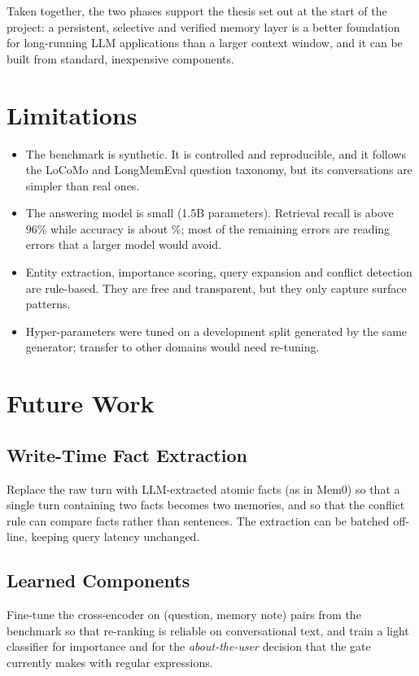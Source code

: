 Taken together, the two phases support the thesis set out at the start of the project: a persistent,
selective and verified memory layer is a better foundation for long-running LLM applications than a larger
context window, and it can be built from standard, inexpensive components.

\section{Limitations}
\begin{itemize}[nosep]
  \item The benchmark is synthetic. It is controlled and reproducible, and it follows the LoCoMo and
        LongMemEval question taxonomy, but its conversations are simpler than real ones.
  \item The answering model is small (1.5B parameters). Retrieval recall is above 96\% while accuracy is
        about \accMem\%; most of the remaining errors are reading errors that a larger model would avoid.
  \item Entity extraction, importance scoring, query expansion and conflict detection are rule-based. They
        are free and transparent, but they only capture surface patterns.
  \item Hyper-parameters were tuned on a development split generated by the same generator; transfer to
        other domains would need re-tuning.
\end{itemize}

\section{Future Work}
\subsection{Write-Time Fact Extraction}
Replace the raw turn with LLM-extracted atomic facts (as in Mem0) so that a single turn containing two facts
becomes two memories, and so that the conflict rule can compare facts rather than sentences. The
extraction can be batched off-line, keeping query latency unchanged.

\subsection{Learned Components}
Fine-tune the cross-encoder on (question, memory note) pairs from the benchmark so that re-ranking is
reliable on conversational text, and train a light classifier for importance and for the
\emph{about-the-user} decision that the gate currently makes with regular expressions.

